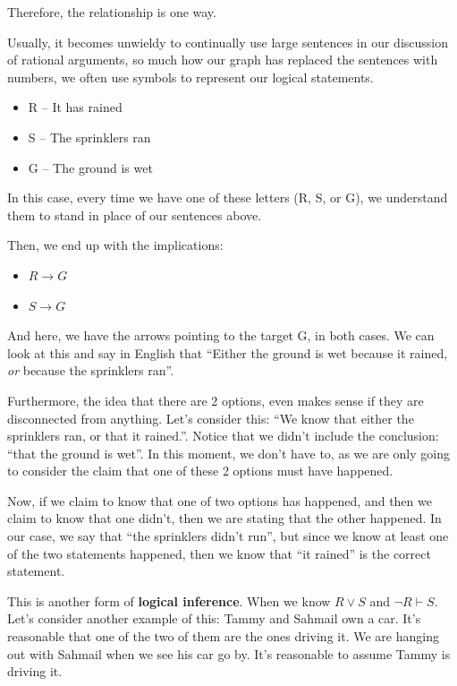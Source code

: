 Therefore, the relationship is one way.

Usually, it becomes unwieldy to continually use large sentences in our discussion of rational arguments, so much how our graph has replaced the sentences with numbers, we often use symbols to represent our logical statements.

\begin{itemize}
    \item R -- It has rained
    \item S -- The sprinklers ran
    \item G -- The ground is wet
\end{itemize}

In this case, every time we have one of these letters (R, S, or G), we understand them to stand in place of our sentences above.

Then, we end up with the implications:

\begin{itemize}
    \item $R \to G$
    \item $S \to G$
\end{itemize}

And here, we have the arrows pointing to the target G, in both cases. We can look at this and say in English that ``Either the ground is wet because it rained, \textit{or} because the sprinklers ran''.

Furthermore, the idea that there are 2 options, even makes sense if they are disconnected from anything. Let's consider this: ``We know that either the sprinklers ran, or that it rained.''. Notice that we didn't include the conclusion: ``that the ground is wet''. In this moment, we don't have to, as we are only going to consider the claim that one of these 2 options must have happened.

Now, if we claim to know that one of two options has happened, and then we claim to know that one didn't, then we are stating that the other happened. In our case, we say that ``the sprinklers didn't run'', but since we know at least one of the two statements happened, then we know that ``it rained'' is the correct statement.

This is another form of \textbf{logical inference}. When we know $R \vee S$ and $\neg R \vdash S$. Let's consider another example of this: Tammy and Sahmail own a car. It's reasonable that one of the two of them are the ones driving it. We are hanging out with Sahmail when we see his car go by. It's reasonable to assume Tammy is driving it.


